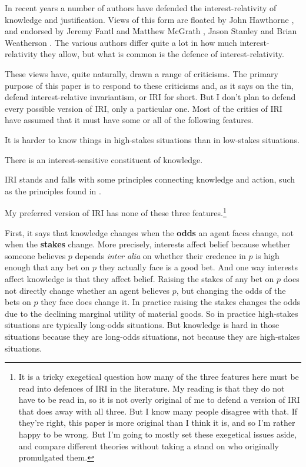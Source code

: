 \documentclass[oneside]{book}
\begin{document}
\noindent In recent years a number of authors have defended the interest-relativity of knowledge and justification.   Views of this form are floated by John Hawthorne \citeyearpar{Hawthorne2004}, and endorsed by Jeremy Fantl and Matthew McGrath \citeyearpar{Fantl2002, FantlMcGrath2009}, Jason Stanley \citeyearpar{Stanley2005-STAKAP} and Brian Weatherson \citeyearpar{Weatherson2005-WEACWD}. The various authors differ quite a lot in how much interest-relativity they allow, but what is common is the defence of interest-relativity.

These views have, quite naturally, drawn a range of criticisms. The primary purpose of this paper is to respond to these criticisms and, as it says on the tin, defend interest-relative invariantism, or IRI for short. But I don't plan to defend every possible version of IRI, only a particular one. Most of the critics of IRI have assumed that it must have some or all of the following features.

\begin{enumerate*}
\item It is harder to know things in high-stakes situations than in low-stakes situations.
\item There is an interest-sensitive constituent of knowledge.
\item IRI stands and falls with some principles connecting knowledge and action, such as the principles found in \cite{HawthorneStanley}.
\end{enumerate*}

\noindent My preferred version of IRI has none of these three features.\footnote{It is a tricky exegetical question how many of the three features here must be read into defences of IRI in the literature. My reading is that they do not have to be read in, so it is not overly original of me to defend a version of IRI that does away with all three. But I know many people disagree with that. If they're right, this paper is more original than I think it is, and so I'm rather happy to be wrong. But I'm going to mostly set these exegetical issues aside, and compare different theories without taking a stand on who originally promulgated them.}

First, it says that knowledge changes when the \textbf{odds} an agent faces change, not when the \textbf{stakes} change. More precisely, interests affect belief because  whether someone believes $p$ depends \textit{inter alia} on whether their credence in $p$ is high enough that any bet on $p$ they actually face is a good bet. And one way interests affect knowledge is that they affect belief. Raising the stakes of any bet on $p$ does not directly change whether an agent believes $p$, but changing the odds of the bets on $p$ they face does change it. In practice raising the stakes changes the odds due to the declining marginal utility of material goods. So in practice high-stakes situations are typically long-odds situations. But knowledge is hard in those situations because they are long-odds situations, not because they are high-stakes situations.
\end{document}
